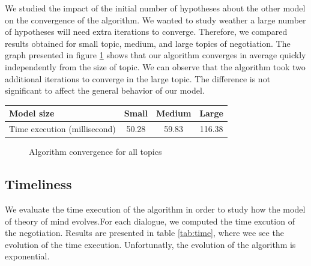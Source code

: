 \documentclass[sigconf]{aamas}  %
\begin{document}
	We studied the impact of the initial number of hypotheses about the other model on the convergence of the algorithm. We wanted to study weather a large number of hypotheses will need extra iterations to converge. Therefore, we compared results obtained for small topic, medium, and large topics of negotiation. The graph presented in figure \ref{fig:converge} shows that our algorithm converges in average quickly independently from the size of topic. We can observe that the algorithm took two additional iterations to converge in the large topic. The difference is not significant to affect the general behavior of our model.
	\begin{table}
		\begin{tabular}{|p{2 cm}|c|c|c|}
			\hline
			Model size & Small & Medium & Large \\
			\hline
			Time execution (millisecond) & 50.28 &	59.83 &	116.38\\
			\hline
		\end{tabular}
	\end{table}
	
		\begin{figure}[]
			\caption{Algorithm convergence for all topics} 
			\label{fig:converge}
		\end{figure}
	
	
	\subsection{Timeliness}
	We evaluate the time execution of the algorithm in order to study how the model of theory of mind evolves.For each dialogue, we computed the time excution of the negotiation. Results are presented in table \ref{tab:time}, where wee see the evolution of the time execution. Unfortunatly, the evolution of the algorithm is exponential.
\end{document}
